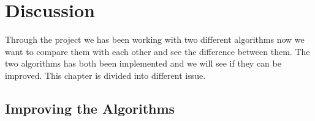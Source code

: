 \chapter{Discussion}

Through the project we has been working with two different algorithms now we want to compare them with each other and see the difference between them. The two algorithms has both been implemented and we will see if they can be improved.  
This chapter is divided into different issue.



\section{Improving the Algorithms}



